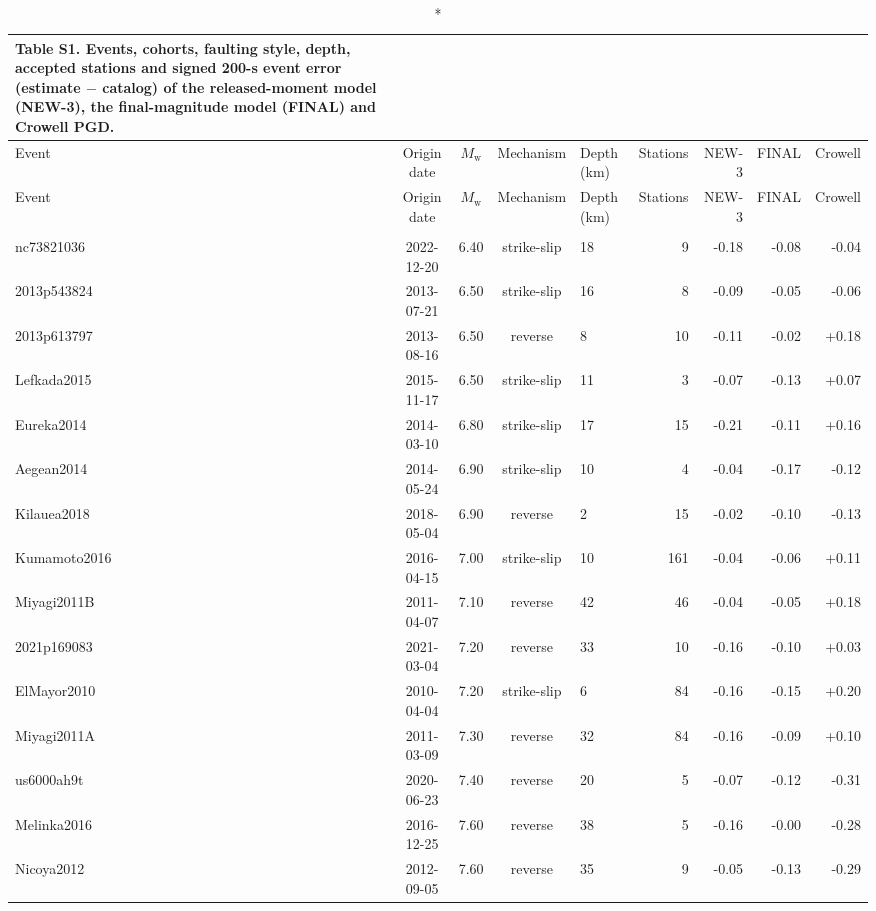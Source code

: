 \begin{longtable}{@{}lccclrrrr@{}}
\caption*{\textbf{Table S1.} Events, cohorts, faulting style, depth, accepted stations and signed 200-s event error (estimate $-$ catalog) of the released-moment model (NEW-3), the final-magnitude model (FINAL) and Crowell PGD.}\\
\toprule
Event & Origin date & $M_{\mathrm{w}}$ & Mechanism & Depth (km) & Stations & NEW-3 & FINAL & Crowell \\
\midrule
\endfirsthead
\toprule
Event & Origin date & $M_{\mathrm{w}}$ & Mechanism & Depth (km) & Stations & NEW-3 & FINAL & Crowell \\
\midrule
\endhead
\bottomrule
\endfoot
\multicolumn{9}{@{}l}{\textit{Training cohort} (24 events, 1,798 records)} \\
nc73821036 & 2022-12-20 & 6.40 & strike-slip & 18 & 9 & -0.18 & -0.08 & -0.04 \\
2013p543824 & 2013-07-21 & 6.50 & strike-slip & 16 & 8 & -0.09 & -0.05 & -0.06 \\
2013p613797 & 2013-08-16 & 6.50 & reverse & 8 & 10 & -0.11 & -0.02 & +0.18 \\
Lefkada2015 & 2015-11-17 & 6.50 & strike-slip & 11 & 3 & -0.07 & -0.13 & +0.07 \\
Eureka2014 & 2014-03-10 & 6.80 & strike-slip & 17 & 15 & -0.21 & -0.11 & +0.16 \\
Aegean2014 & 2014-05-24 & 6.90 & strike-slip & 10 & 4 & -0.04 & -0.17 & -0.12 \\
Kilauea2018 & 2018-05-04 & 6.90 & reverse & 2 & 15 & -0.02 & -0.10 & -0.13 \\
Kumamoto2016 & 2016-04-15 & 7.00 & strike-slip & 10 & 161 & -0.04 & -0.06 & +0.11 \\
Miyagi2011B & 2011-04-07 & 7.10 & reverse & 42 & 46 & -0.04 & -0.05 & +0.18 \\
2021p169083 & 2021-03-04 & 7.20 & reverse & 33 & 10 & -0.16 & -0.10 & +0.03 \\
ElMayor2010 & 2010-04-04 & 7.20 & strike-slip & 6 & 84 & -0.16 & -0.15 & +0.20 \\
Miyagi2011A & 2011-03-09 & 7.30 & reverse & 32 & 84 & -0.16 & -0.09 & +0.10 \\
us6000ah9t & 2020-06-23 & 7.40 & reverse & 20 & 5 & -0.07 & -0.12 & -0.31 \\
Melinka2016 & 2016-12-25 & 7.60 & reverse & 38 & 5 & -0.16 & -0.00 & -0.28 \\
Nicoya2012 & 2012-09-05 & 7.60 & reverse & 35 & 9 & -0.05 & -0.13 & -0.29 \\

\end{longtable}
